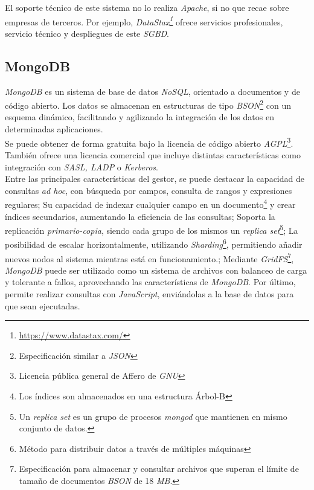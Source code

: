 \documentclass{article}
\begin{document}
El soporte técnico de este sistema no lo realiza \emph{Apache}, si no que recae sobre empresas de terceros. Por ejemplo, \emph{DataStax\footnote{\url{https://www.datastax.com/}}} ofrece servicios profesionales, servicio técnico y despliegues de este \emph{SGBD}. \cite{APW:1}\\

\subsection{MongoDB}

\emph{MongoDB} es un sistema de base de datos \emph{NoSQL}, orientado a documentos y de código abierto. Los datos se almacenan en estructuras de tipo \emph{BSON}\footnote{Especificación similar a \emph{JSON}} con un esquema dinámico, facilitando y agilizando la integración de los datos en determinadas aplicaciones.\\
Se puede obtener de forma gratuita bajo la licencia de código abierto  \emph{AGPL}\footnote{Licencia pública general de Affero de \emph{GNU}}. También ofrece una licencia comercial que incluye distintas características como integración con \emph{SASL, LADP} o \emph{Kerberos}.\cite{WIKI:13}\\

Entre las principales características del gestor\cite{WIKI:14}, se puede destacar la capacidad de consultas \emph{ad hoc}, con búsqueda por campos, consulta de rangos y expresiones regulares; Su capacidad de indexar cualquier campo en un documento\footnote{Los índices son almacenados en una estructura Árbol-B} y crear índices secundarios, aumentando la eficiencia de las consultas\cite{MDB:1}; Soporta la replicación \emph{primario-copia}, siendo cada grupo de los mismos un \emph{replica set}\footnote{Un \emph{replica set} es un grupo de procesos \emph{mongod} que mantienen en mismo conjunto de datos.\cite{MDB:2}}; La posibilidad de escalar horizontalmente, utilizando \emph{Sharding}\footnote{Método para distribuir datos a través de múltiples máquinas}, permitiendo añadir nuevos nodos al sistema mientras está en funcionamiento.\cite{MDB:3};  Mediante \emph{GridFS}\footnote{Especificación para almacenar y consultar archivos que superan el límite de tamaño de documentos \emph{BSON} de 18 \emph{MB}.\cite{MDB:4}}, \emph{MongoDB} puede ser utilizado como un sistema de archivos con balanceo de carga y tolerante a fallos, aprovechando las características de \emph{MongoDB}. Por último, permite realizar consultas con \emph{JavaScript}\cite{MDB:5}, enviándolas a la base de datos para que sean ejecutadas.\\
\end{document}
